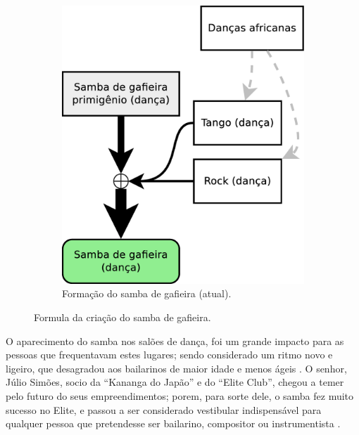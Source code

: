 \begin{figure}[h]
\begin{subfigure}[b]{0.385\textwidth}
    \includegraphics[width=\textwidth]{chapters/cap-historia-sambagafieira/sambagafieiraformula2.eps}
    \caption{Formação do samba de gafieira (atual).}
    \label{fig:formuladosambagafieira2}
  \end{subfigure}
\caption{Formula da criação do samba de gafieira.}
\label{fig:formuladosambagafieiraall}
\end{figure}


O aparecimento do samba nos salões de dança, 
foi um grande impacto para as pessoas que frequentavam estes lugares;
sendo considerado um ritmo novo e ligeiro,
que desagradou aos bailarinos de maior idade e menos ágeis \cite[pp. 6 - cad. B]{entrevistajuliojournalbrasil1}.
O senhor, Júlio Simões, socio da ``Kananga do Japão'' e
do ``Elite Club'', chegou a temer pelo futuro do seus empreendimentos; porem, para sorte dele, 
o samba fez muito sucesso no Elite,
e passou a ser considerado vestibular indispensável para qualquer pessoa que pretendesse ser bailarino, 
compositor ou instrumentista \cite[pp. 6 - cad. B]{entrevistajuliojournalbrasil1}.

